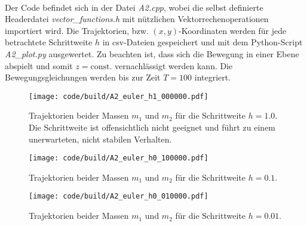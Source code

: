 \\
Der Code befindet sich in der Datei \textit{A2.cpp}, wobei die selbst definierte Headerdatei \textit{vector\_functions.h} mit nützlichen Vektorrechenoperationen importiert wird.
Die Trajektorien, bzw. $(x, y)$-Koordinaten werden für jede betrachtete Schrittweite $h$ in csv-Dateien gespeichert und mit dem Python-Script \textit{A2\_plot.py} ausgewertet.
Zu beachten ist, dass sich die Bewegung in einer Ebene abspielt und somit $z=\text{const.}$ vernachlässigt werden kann.
Die Bewegungsgleichungen werden bis zur Zeit $T=100$ integriert.
\begin{figure}
    \centering
    \texttt{[image: code/build/A2\_euler\_h1\_000000.pdf]}
    \caption{Trajektorien beider Massen $m_1$ und $m_2$ für die Schrittweite $h=1.0$.
    Die Schrittweite ist offensichtlich nicht geeignet und führt zu einem unerwarteten, nicht stabilen Verhalten.
    }
\end{figure}
\begin{figure}
    \centering
    \texttt{[image: code/build/A2\_euler\_h0\_100000.pdf]}
    \caption{Trajektorien beider Massen $m_1$ und $m_2$ für die Schrittweite $h=0.1$.
    }
\end{figure}
\begin{figure}
    \centering
    \texttt{[image: code/build/A2\_euler\_h0\_010000.pdf]}
    \caption{Trajektorien beider Massen $m_1$ und $m_2$ für die Schrittweite $h=0.01$.
    }
\end{figure}
\FloatBarrier

